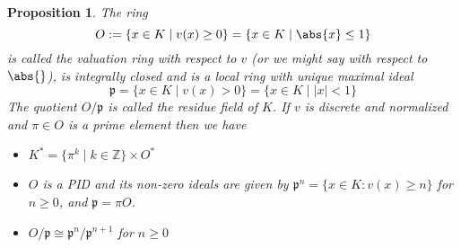 \documentclass{article}
\newtheorem{proposition}{Proposition}[section]
\newcommand{\mfrak}[1]{\mathfrak{#1}}
\newcommand{\mbb}[1]{\mathbb{#1}}
\numberwithin{equation}{section}
\begin{document}
\begin{proposition}\label{prop: Valuation ring of a field}
    The ring
    $$O := \{x \in K \mid  v(x) \geq 0 \} = \{x \in K \mid  \abs{x} \leq 1 \}$$
    is called the valuation ring with respect to $v$ (or we might say with respect to $\abs{}$), is integrally closed and is a local ring with unique maximal ideal
    $$\mfrak p = \{x \in K \mid v(x) > 0 \} = \{x \in K \mid |x| < 1 \}$$
    The quotient $O / \mfrak p$ is called the residue field of $K$. If $v$ is discrete and normalized and $\pi \in O$ is a prime element then we have
    \begin{itemize}
        \item $K^* = \{\pi^k \mid k \in \mbb Z \} \times O^*$
        \item $O$ is a PID and its non-zero ideals are given by
              $\mfrak p^n = \{x \in K : v(x) \geq n \}$
              for $n \geq 0$, and $\mfrak p = \pi O$.
        \item $O / \mfrak p \cong \mfrak p^n / \mfrak p^{n+1}$ for $n \geq 0$
    \end{itemize}
\end{proposition}
\end{document}
